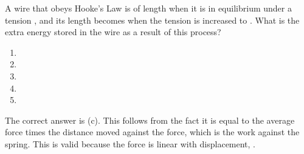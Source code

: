 
\begin{problem} 
{A wire that obeys Hooke's Law is of length  when it is in equilibrium under a tension , and its length becomes  when the tension is increased to . What is the extra energy stored in the wire as a result of this process?
\begin{enumerate}
	\item {}
	\item {}
	\item {} \answer
	\item {}
	\item {}
\end{enumerate}
}
{}
{The correct answer is (c). This follows from the fact it is equal to the average force times the distance moved against the force, which is the work against the spring. This is valid because the force is linear with displacement, .}
\end{problem}